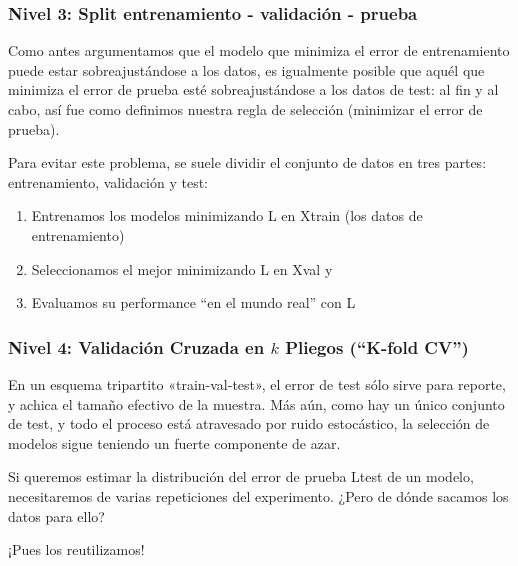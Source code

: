 \documentclass[aspectratio=169,12pt]{beamer}
\begin{document}

\begin{frame}
\frametitle{Nivel 3: Split entrenamiento - validación - prueba}

Como antes argumentamos que el modelo que minimiza el error de entrenamiento
puede estar sobreajustándose a los datos, es igualmente posible que aquél que minimiza el error de prueba esté sobreajustándose a los datos de test: al fin y al cabo, así fue como definimos nuestra regla de selección (minimizar el error de prueba).

Para evitar este problema, se suele dividir el conjunto de datos en tres partes: entrenamiento, validación y test:
\begin{enumerate}
\item Entrenamos los modelos minimizando L en Xtrain (los datos de entrenamiento)
\item Seleccionamos el mejor minimizando L en Xval y
\item Evaluamos su performance ``en el mundo real'' con L
\end{enumerate}

\end{frame}


\begin{frame}
\frametitle{Nivel 4: Validación Cruzada en $k$ Pliegos (``K-fold CV'')}

En un esquema tripartito «train-val-test», el error de test sólo sirve para reporte, y
achica el tamaño efectivo de la muestra. Más aún, como hay un único conjunto de
test, y todo el proceso está atravesado por ruido estocástico, la selección de modelos
sigue teniendo un fuerte componente de azar.

Si queremos estimar la distribución del error de prueba Ltest de un modelo, necesitaremos de varias repeticiones del experimento. ¿Pero de dónde sacamos los datos para ello?

¡Pues los reutilizamos!

\end{frame}


\end{document}
